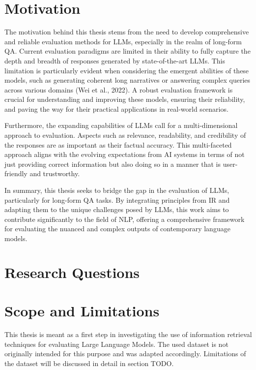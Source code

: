 \section{Motivation}\label{sec:motivation}

The motivation behind this thesis stems from the need to develop comprehensive and reliable evaluation methods for LLMs, especially in the realm of long-form QA. Current evaluation paradigms are limited in their ability to fully capture the depth and breadth of responses generated by state-of-the-art LLMs. This limitation is particularly evident when considering the emergent abilities of these models, such as generating coherent long narratives or answering complex queries across various domains (Wei et al., 2022). A robust evaluation framework is crucial for understanding and improving these models, ensuring their reliability, and paving the way for their practical applications in real-world scenarios.

Furthermore, the expanding capabilities of LLMs call for a multi-dimensional approach to evaluation. Aspects such as relevance, readability, and credibility of the responses are as important as their factual accuracy. This multi-faceted approach aligns with the evolving expectations from AI systems in terms of not just providing correct information but also doing so in a manner that is user-friendly and trustworthy.

In summary, this thesis seeks to bridge the gap in the evaluation of LLMs, particularly for long-form QA tasks. By integrating principles from IR and adapting them to the unique challenges posed by LLMs, this work aims to contribute significantly to the field of NLP, offering a comprehensive framework for evaluating the nuanced and complex outputs of contemporary language models.

\section{Research Questions}\label{sec:research-question}


\section{Scope and Limitations}\label{sec:scope-and-limitations}
This thesis is meant as a first step in investigating the use of information retrieval techniques for evaluating Large Language Models.
The used dataset is not originally intended for this purpose and was adapted accordingly.
Limitations of the dataset will be discussed in detail in section TODO.



